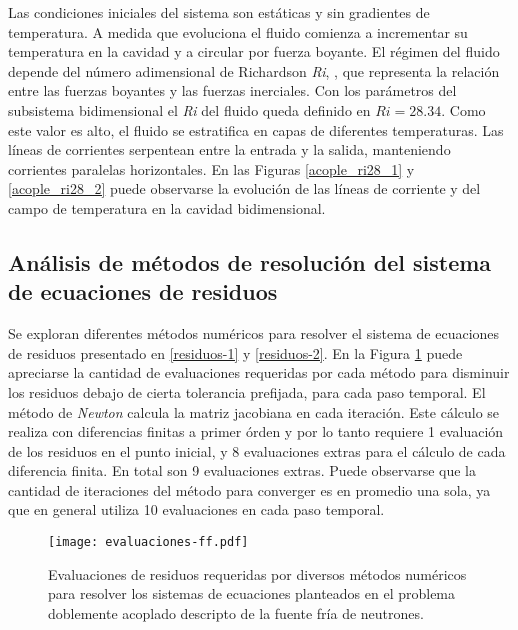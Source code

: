 Las condiciones iniciales del sistema son estáticas y sin gradientes de temperatura.
A medida que evoluciona el fluido comienza a incrementar su temperatura en la cavidad y a circular por fuerza boyante.
El régimen del fluido depende del número adimensional de Richardson \textit{Ri}, \cite{richardson},
que representa la relación entre las fuerzas boyantes y las fuerzas inerciales.
Con los parámetros del subsistema bidimensional el \textit{Ri} del fluido queda definido en $Ri=28.34$.
Como este valor es alto, el fluido se estratifica en capas de diferentes temperaturas.
Las líneas de corrientes serpentean entre la entrada y la salida, manteniendo corrientes paralelas horizontales.
En las Figuras \ref{acople_ri28_1} y \ref{acople_ri28_2} puede observarse 
la evolución de las líneas de corriente y del campo de temperatura en la cavidad bidimensional.

\subsection*{Análisis de métodos de resolución del sistema de ecuaciones de residuos}

Se exploran diferentes métodos numéricos para resolver el sistema de ecuaciones de residuos presentado en \ref{residuos-1} y \ref{residuos-2}.
En la Figura \ref{iteraciones_ri} puede apreciarse la cantidad de evaluaciones requeridas 
por cada método para disminuir los residuos debajo de cierta tolerancia prefijada, para cada paso temporal.
El método de \textit{Newton} calcula la matriz jacobiana en cada iteración.
Este cálculo se realiza con diferencias finitas a primer órden y por lo tanto requiere 1 evaluación de los residuos en el punto inicial, y 8 evaluaciones extras para el cálculo de cada diferencia finita.
En total son 9 evaluaciones extras.
Puede observarse que la cantidad de iteraciones del método para converger es en promedio una sola, ya que en general utiliza 10 evaluaciones en cada paso temporal.

\begin{figure}[ht]
\centering{}\texttt{[image: evaluaciones-ff.pdf]}
\caption
{Evaluaciones de residuos requeridas por diversos métodos numéricos para resolver los sistemas de ecuaciones planteados
 en el problema doblemente acoplado descripto de la fuente fría de neutrones.} \label{iteraciones_ri} 
\end{figure}

